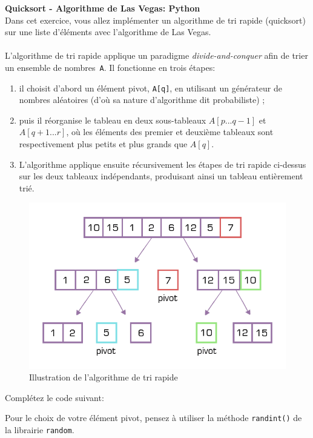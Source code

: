 \begin{Exercice}[20 minutes] \textbf{Quicksort - Algorithme de Las Vegas: Python}\\
    Dans cet exercice, vous allez implémenter un algorithme de tri rapide (quicksort) sur une liste d'éléments avec l'algorithme de Las Vegas.
\\\\
    L'algorithme de tri rapide applique un paradigme \textit{divide-and-conquer} afin de trier un ensemble de nombres~\lstinline{A}. Il fonctionne en trois étapes: 
    \begin{enumerate}
        \item il choisit d'abord un élément pivot, \lstinline{A[q]}, en utilisant un générateur de nombres aléatoires (d'où sa nature d'algorithme dit probabiliste) ;
        \item puis il réorganise le tableau en deux sous-tableaux $A[p...q-1]$ et $A[q+1...r]$, où les éléments des premier et deuxième tableaux sont respectivement plus petits et plus grands que $A[q]$.
        \item L'algorithme applique ensuite récursivement les étapes de tri rapide ci-dessus sur les deux tableaux indépendants, produisant ainsi un tableau entièrement trié.\\
    \end{enumerate}
    \begin{figure}[h]
        \centering
        \includegraphics[width=\linewidth]{resources/quicksort.png}
        \caption{Illustration de l'algorithme de tri rapide}
    \end{figure}
    Complétez le code suivant:
    
    \begin{conseil}
        Pour le choix de votre élément pivot, pensez à utiliser la méthode \lstinline{randint()} de la librairie \lstinline{random}.
    \end{conseil}


    \begin{solution}
        
    \end{solution}
     


\end{Exercice}


